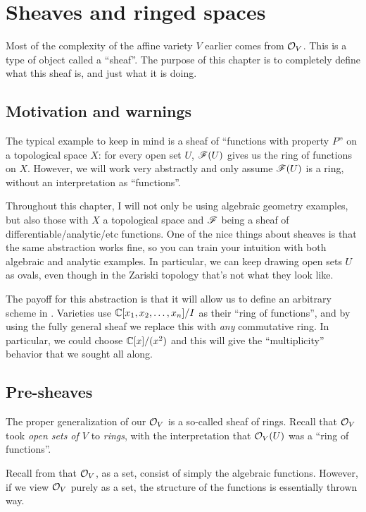 \chapter{Sheaves and ringed spaces}
Most of the complexity of the affine variety $V$ earlier comes from $\mathcal O_V$.
This is a type of object called a ``sheaf''.
The purpose of this chapter is to completely define what this sheaf is,
and just what it is doing.

\section{Motivation and warnings}
The typical example to keep in mind is a sheaf of
``functions with property $P$'' on a topological space $X$:
for every open set $U$, $\mathscr F(U)$ gives us the ring of functions on $X$.
However, we will work very abstractly and only assume $\mathscr F(U)$
is a ring, without an interpretation as ``functions''.

Throughout this chapter, I will not only be using algebraic geometry
examples, but also those with $X$ a topological space
and $\mathscr F$ being a sheaf of differentiable/analytic/etc functions.
One of the nice things about sheaves is that the same abstraction works fine,
so you can train your intuition with both algebraic and analytic examples.
In particular, we can keep drawing open sets $U$ as ovals,
even though in the Zariski topology that's not what they look like.

The payoff for this abstraction is that it will
allow us to define an arbitrary scheme in .
Varieties use $\mathbb C[x_1, x_2, \dots, x_n] / I$ as their ``ring of functions'',
and by using the fully general sheaf we replace this
with \emph{any} commutative ring.
In particular, we could choose $\mathbb C[x] / (x^2)$
and this will give the ``multiplicity''
behavior that we sought all along.


\section{Pre-sheaves}

The proper generalization of our $\mathcal O_V$ is a so-called sheaf of rings.
Recall that $\mathcal O_V$ took \emph{open sets of $V$} to \emph{rings},
with the interpretation that $\mathcal O_V(U)$ was a ``ring of functions''.

Recall from  that $\mathcal O_V$, as a set, consist
of simply the algebraic functions. However, if we view $\mathcal O_V$ purely as a set,
the structure of the functions is essentially thrown way.

